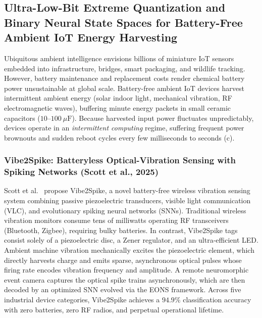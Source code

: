 \subsection{Ultra-Low-Bit Extreme Quantization and Binary Neural State Spaces for Battery-Free Ambient IoT Energy Harvesting}
\label{sec:batteryless_spiking_iot}

Ubiquitous ambient intelligence envisions billions of miniature IoT sensors embedded into infrastructure, bridges, smart packaging, and wildlife tracking. However, battery maintenance and replacement costs render chemical battery power unsustainable at global scale. Battery-free ambient IoT devices harvest intermittent ambient energy (solar indoor light, mechanical vibration, RF electromagnetic waves), buffering minute energy packets in small ceramic capacitors ($10$--$100\ \mu\text{F}$). Because harvested input power fluctuates unpredictably, devices operate in an \emph{intermittent computing} regime, suffering frequent power brownouts and sudden reboot cycles every few milliseconds to seconds (c).

\subsubsection{Vibe2Spike: Batteryless Optical-Vibration Sensing with Spiking Networks (Scott et al., 2025)}
Scott et al.~\cite{Scott2025Vibe2Spike} propose Vibe2Spike, a novel battery-free wireless vibration sensing system combining passive piezoelectric transducers, visible light communication (VLC), and evolutionary spiking neural networks (SNNs). Traditional wireless vibration monitors consume tens of milliwatts operating RF transceivers (Bluetooth, Zigbee), requiring bulky batteries. In contrast, Vibe2Spike tags consist solely of a piezoelectric disc, a Zener regulator, and an ultra-efficient LED. Ambient machine vibration mechanically excites the piezoelectric element, which directly harvests charge and emits sparse, asynchronous optical pulses whose firing rate encodes vibration frequency and amplitude. A remote neuromorphic event camera captures the optical spike trains asynchronously, which are then decoded by an optimized SNN evolved via the EONS framework. Across five industrial device categories, Vibe2Spike achieves a $94.9\%$ classification accuracy with zero batteries, zero RF radios, and perpetual operational lifetime.

